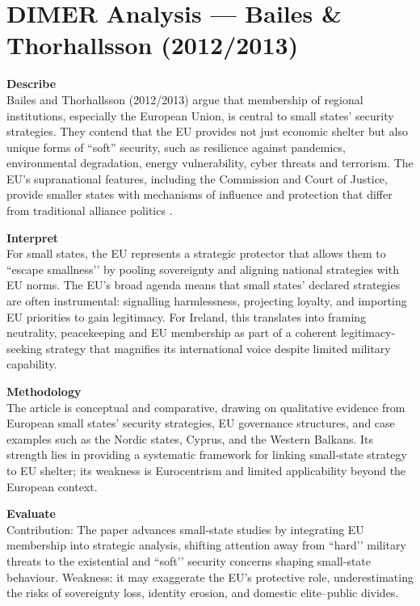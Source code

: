 \section*{DIMER Analysis — Bailes \& Thorhallsson (2012/2013)}

\textbf{Describe} \\
Bailes and Thorhallsson (2012/2013) argue that membership of regional institutions, especially the European Union, is central to small states’ security strategies. They contend that the EU provides not just economic shelter but also unique forms of ``soft'' security, such as resilience against pandemics, environmental degradation, energy vulnerability, cyber threats and terrorism. The EU’s supranational features, including the Commission and Court of Justice, provide smaller states with mechanisms of influence and protection that differ from traditional alliance politics \parencite{BAILES_2012}.  

\textbf{Interpret} \\
For small states, the EU represents a strategic protector that allows them to ``escape smallness’’ by pooling sovereignty and aligning national strategies with EU norms. The EU’s broad agenda means that small states’ declared strategies are often instrumental: signalling harmlessness, projecting loyalty, and importing EU priorities to gain legitimacy. For Ireland, this translates into framing neutrality, peacekeeping and EU membership as part of a coherent legitimacy-seeking strategy that magnifies its international voice despite limited military capability.

\textbf{Methodology} \\
The article is conceptual and comparative, drawing on qualitative evidence from European small states’ security strategies, EU governance structures, and case examples such as the Nordic states, Cyprus, and the Western Balkans. Its strength lies in providing a systematic framework for linking small-state strategy to EU shelter; its weakness is Eurocentrism and limited applicability beyond the European context.

\textbf{Evaluate} \\
Contribution: The paper advances small-state studies by integrating EU membership into strategic analysis, shifting attention away from ``hard’’ military threats to the existential and ``soft’’ security concerns shaping small-state behaviour. Weakness: it may exaggerate the EU’s protective role, underestimating the risks of sovereignty loss, identity erosion, and domestic elite–public divides.  

